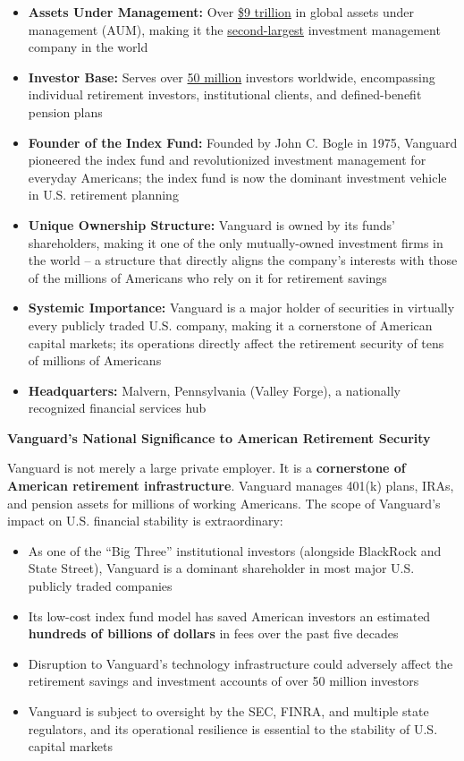 \begin{itemize}
    \item \textbf{Assets Under Management:} Over \underline{\$9 trillion} in global assets under management (AUM), making it the \underline{second-largest} investment management company in the world
    \item \textbf{Investor Base:} Serves over \underline{50 million} investors worldwide, encompassing individual retirement investors, institutional clients, and defined-benefit pension plans
    \item \textbf{Founder of the Index Fund:} Founded by John C. Bogle in 1975, Vanguard pioneered the index fund and revolutionized investment management for everyday Americans; the index fund is now the dominant investment vehicle in U.S. retirement planning
    \item \textbf{Unique Ownership Structure:} Vanguard is owned by its funds' shareholders, making it one of the only mutually-owned investment firms in the world -- a structure that directly aligns the company's interests with those of the millions of Americans who rely on it for retirement savings
    \item \textbf{Systemic Importance:} Vanguard is a major holder of securities in virtually every publicly traded U.S. company, making it a cornerstone of American capital markets; its operations directly affect the retirement security of tens of millions of Americans
    \item \textbf{Headquarters:} Malvern, Pennsylvania (Valley Forge), a nationally recognized financial services hub
\end{itemize}

\textbf{Vanguard's National Significance to American Retirement Security}

Vanguard is not merely a large private employer. It is a \textbf{cornerstone of American retirement infrastructure}. Vanguard manages 401(k) plans, IRAs, and pension assets for millions of working Americans. The scope of Vanguard's impact on U.S. financial stability is extraordinary:

\begin{itemize}
    \item As one of the ``Big Three'' institutional investors (alongside BlackRock and State Street), Vanguard is a dominant shareholder in most major U.S. publicly traded companies
    \item Its low-cost index fund model has saved American investors an estimated \textbf{hundreds of billions of dollars} in fees over the past five decades
    \item Disruption to Vanguard's technology infrastructure could adversely affect the retirement savings and investment accounts of over 50 million investors
    \item Vanguard is subject to oversight by the SEC, FINRA, and multiple state regulators, and its operational resilience is essential to the stability of U.S. capital markets
\end{itemize}

